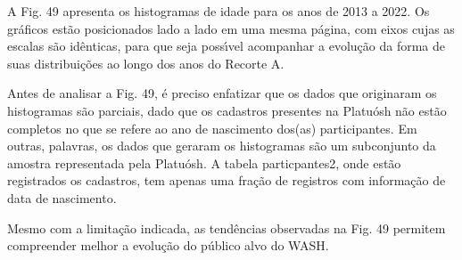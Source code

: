 \documentclass[
12pt,		%
openright,	%
twoside,  %
a4paper,			%
chapter=TITLE,		%
english,			%
french,				%
spanish,			%
brazil				%
]{USPSC-classe/USPSC}
\begin{document}
A Fig. 49 apresenta os histogramas de idade para os anos de 2013 a 2022. Os gr\'aficos est\~ao posicionados lado a lado em uma mesma p\'agina, com eixos cujas as escalas s\~ao id\^enticas, para que seja poss\'{\i}vel acompanhar a evolu\c{c}\~ao da forma de suas distribui\c{c}\~oes ao longo dos anos do Recorte A.








Antes de analisar a Fig. 49, \'e preciso enfatizar que os dados que originaram os histogramas s\~ao parciais, dado que os cadastros presentes na Platu\'osh n\~ao est\~ao completos no que se refere ao ano de nascimento dos(as) participantes. Em outras, palavras, os dados que geraram os histogramas s\~ao um subconjunto da amostra representada pela Platu\'osh. A tabela particpantes2, onde est\~ao registrados os cadastros, tem apenas uma fra\c{c}\~ao de registros com informa\c{c}\~ao de data de nascimento.








Mesmo com a limita\c{c}\~ao indicada, as tend\^encias observadas na Fig. 49 permitem compreender melhor a evolu\c{c}\~ao do p\'ublico alvo do WASH.
\end{document}
